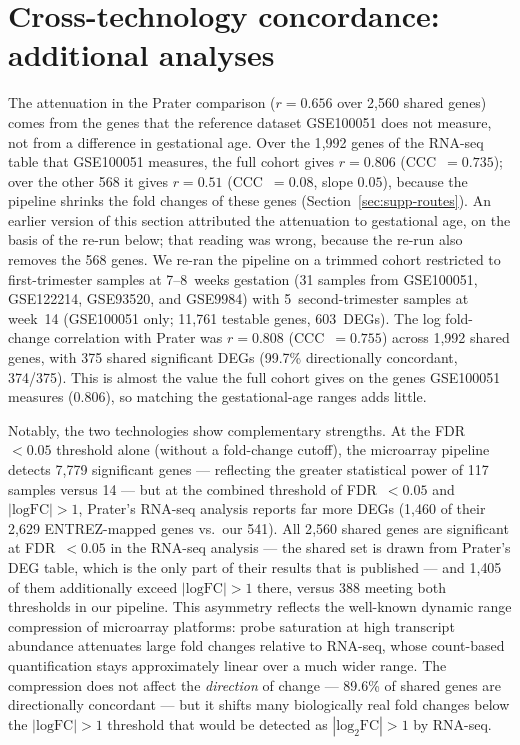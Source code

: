 \documentclass[11pt,a4paper]{article}
\begin{document}
\section{Cross-technology concordance: additional analyses}
\label{sec:supp-rnaseq}

The attenuation in the Prater comparison ($r = 0.656$ over 2{,}560
shared genes) comes from the genes that the reference dataset
GSE100051 does not measure, not from a difference in gestational
age. Over the 1{,}992 genes of the RNA-seq table that GSE100051
measures, the full cohort gives $r = 0.806$ (CCC~$= 0.735$); over
the other 568 it gives $r = 0.51$ (CCC~$= 0.08$, slope $0.05$),
because the pipeline shrinks the fold changes of these genes
(Section~\ref{sec:supp-routes}). An earlier version of this section
attributed the attenuation to gestational age, on the basis of the
re-run below; that reading was wrong, because the re-run also
removes the 568 genes. We re-ran the pipeline on a
trimmed cohort restricted to first-trimester samples at
7--8~weeks gestation (31 samples from GSE100051, GSE122214,
GSE93520, and GSE9984) with 5~second-trimester samples at
week~14 (GSE100051 only; 11{,}761 testable genes, 603~DEGs).
The log fold-change correlation with Prater was
$r = 0.808$ (CCC~$= 0.755$) across 1{,}992 shared genes,
with 375 shared significant DEGs (99.7\% directionally concordant,
374/375).
This is almost the value the full cohort gives on the genes
GSE100051 measures ($0.806$), so matching the gestational-age
ranges adds little.

Notably, the two technologies show complementary strengths. At
the FDR~$< 0.05$ threshold alone (without a fold-change cutoff),
the microarray pipeline detects 7{,}779 significant genes ---
reflecting the greater statistical power of 117 samples versus 14
--- but at the combined threshold of FDR~$< 0.05$ and
$|\text{logFC}| > 1$, Prater's RNA-seq analysis reports far more
DEGs (1{,}460 of their 2{,}629 ENTREZ-mapped genes vs.\ our
541). All 2{,}560 shared
genes are significant at FDR~$< 0.05$ in the RNA-seq analysis ---
the shared set is drawn from Prater's DEG table, which is the
only part of their results that is published --- and 1{,}405 of
them additionally exceed $|\text{logFC}| > 1$ there, versus 388
meeting both thresholds in our pipeline. This asymmetry reflects the well-known
dynamic range compression of microarray platforms: probe
saturation at high transcript abundance attenuates large fold
changes relative to RNA-seq, whose count-based quantification
stays approximately linear over a much wider range. The compression
does not affect the \emph{direction} of change --- 89.6\% of
shared genes are directionally concordant --- but it shifts many
biologically real fold changes below the $|\text{logFC}| > 1$
threshold that would be detected as $|\text{log}_2\text{FC}| > 1$
by RNA-seq.
\end{document}
